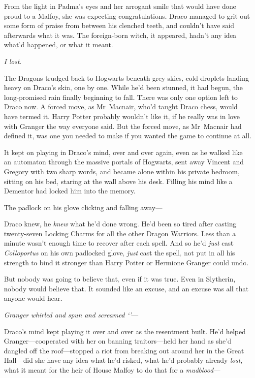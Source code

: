 From the light in Padma’s eyes and her arrogant smile that would have done proud to a Malfoy, she was expecting congratulations. Draco managed to grit out some form of praise from between his clenched teeth, and couldn’t have said afterwards what it was. The foreign-born witch, it appeared, hadn’t any idea what’d happened, or what it meant.

\emph{I lost.}

The Dragons trudged back to Hogwarts beneath grey skies, cold droplets landing heavy on Draco’s skin, one by one. While he’d been stunned, it had begun, the long-promised rain finally beginning to fall. There was only one option left to Draco now. A forced move, as Mr~Macnair, who’d taught Draco chess, would have termed it. Harry Potter probably wouldn’t like it, if he really was in love with Granger the way everyone said. But the forced move, as Mr~Macnair had defined it, was one you needed to make if you wanted the game to continue at all.

It kept on playing in Draco’s mind, over and over again, even as he walked like an automaton through the massive portals of Hogwarts, sent away Vincent and Gregory with two sharp words, and became alone within his private bedroom, sitting on his bed, staring at the wall above his desk. Filling his mind like a Dementor had locked him into the memory.

The padlock on his glove clicking and falling away—

Draco knew, he \emph{knew} what he’d done wrong. He’d been so tired after casting twenty-seven Locking Charms for all the other Dragon Warriors. Less than a minute wasn’t enough time to recover after each spell. And so he’d \emph{just} cast \emph{Colloportus} on his own padlocked glove, \emph{just} cast the spell, not put in all his strength to bind it stronger than Harry Potter or Hermione Granger could undo.

But nobody was going to believe that, even if it was true. Even in Slytherin, nobody would believe that. It sounded like an excuse, and an excuse was all that anyone would hear.

\emph{Granger whirled and spun and screamed ‘’}—

Draco’s mind kept playing it over and over as the resentment built. He’d helped Granger—cooperated with her on banning traitors—held her hand as she’d dangled off the roof—stopped a riot from breaking out around her in the Great Hall—did she have any idea what he’d risked, what he’d probably already \emph{lost}, what it meant for the heir of House Malfoy to do that for a \emph{mudblood}—

